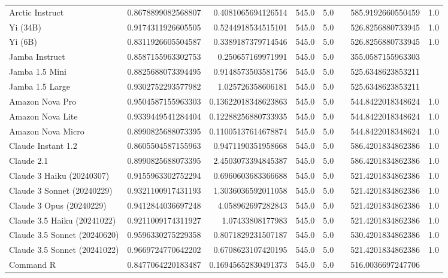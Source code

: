 \begin{table}[htp]
{\begin{tabular}{lrrrrrrr}
Arctic Instruct & 0.8678899082568807 & 0.4081065694126514 & 545.0 & 5.0 &  & 585.9192660550459 & 1.0 \\
Yi (34B) & 0.9174311926605505 & 0.5244918534515101 & 545.0 & 5.0 &  & 526.8256880733945 & 1.0 \\
Yi (6B) & 0.8311926605504587 & 0.3389187379714546 & 545.0 & 5.0 &  & 526.8256880733945 & 1.0 \\
Jamba Instruct & 0.8587155963302753 & 0.250657169971991 & 545.0 & 5.0 &  & 355.0587155963303 &  \\
Jamba 1.5 Mini & 0.8825688073394495 & 0.9148573503581756 & 545.0 & 5.0 &  & 525.6348623853211 &  \\
Jamba 1.5 Large & 0.9302752293577982 & 1.025726358606181 & 545.0 & 5.0 &  & 525.6348623853211 &  \\
Amazon Nova Pro & 0.9504587155963303 & 0.13622018348623863 & 545.0 & 5.0 &  & 544.8422018348624 & 1.0 \\
Amazon Nova Lite & 0.9339449541284404 & 0.12288256880733935 & 545.0 & 5.0 &  & 544.8422018348624 & 1.0 \\
Amazon Nova Micro & 0.8990825688073395 & 0.11005137614678874 & 545.0 & 5.0 &  & 544.8422018348624 & 1.0 \\
Claude Instant 1.2 & 0.8605504587155963 & 0.9471190351958668 & 545.0 & 5.0 &  & 586.4201834862386 & 1.0 \\
Claude 2.1 & 0.8990825688073395 & 2.4503073394845387 & 545.0 & 5.0 &  & 586.4201834862386 & 1.0 \\
Claude 3 Haiku (20240307) & 0.9155963302752294 & 0.6960603683366688 & 545.0 & 5.0 &  & 521.4201834862386 & 1.0 \\
Claude 3 Sonnet (20240229) & 0.9321100917431193 & 1.3036036592011058 & 545.0 & 5.0 &  & 521.4201834862386 & 1.0 \\
Claude 3 Opus (20240229) & 0.9412844036697248 & 4.058962697282843 & 545.0 & 5.0 &  & 521.4201834862386 & 1.0 \\
Claude 3.5 Haiku (20241022) & 0.9211009174311927 & 1.07433808177983 & 545.0 & 5.0 &  & 521.4201834862386 & 1.0 \\
Claude 3.5 Sonnet (20240620) & 0.9596330275229358 & 0.8071829231507187 & 545.0 & 5.0 &  & 530.4201834862386 & 1.0 \\
Claude 3.5 Sonnet (20241022) & 0.9669724770642202 & 0.6708623107420195 & 545.0 & 5.0 &  & 521.4201834862386 & 1.0 \\
Command R & 0.8477064220183487 & 0.16945652830491373 & 545.0 & 5.0 &  & 516.0036697247706 &  \\

\end{tabular}}
\end{table}
